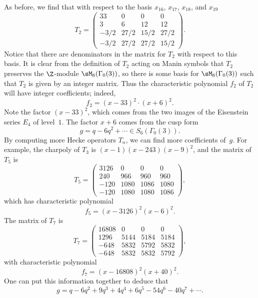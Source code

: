 \begin{example}
As before, we find that with respect to the basis 
$x_{16}$, $x_{17}$, $x_{18}$, and $x_{19}$
$$
T_2 = 
\left(\begin{array}{cccc}
33&0&0&0\\
3&6&12&12\\
-3/2&27/2&15/2&27/2\\
-3/2&27/2&27/2&15/2
\end{array}\right).
$$
Notice that there are denominators in the matrix for
$T_2$ with respect to this basis.  It is clear from
the definition of $T_2$ acting on Manin symbols that
$T_2$ preserves the $\Z$-module $\sM_6(\Gamma_0(3))$,
so there is some basis for $\sM_6(\Gamma_0(3))$
such that $T_2$ is given by an integer matrix.  Thus
the characteristic polynomial $f_2$ of $T_2$ will have integer
coefficients; indeed, 
$$
  f_2 = (x-33)^2 \cdot (x+6)^2.
$$
Note the factor $(x-33)^2$, which comes from the two images
of the Eisenstein series $E_4$ of level~$1$.  The
factor $x+6$ comes from the cusp form 
$$
  g = q - 6q^2 + \cdots \in S_6(\Gamma_0(3)).
$$
By computing more Hecke operators $T_n$, we
can find more coefficients of~$g$.
For example, the charpoly of $T_3$ is 
$(x-1)(x-243)(x-9)^2$, and the matrix of $T_5$
is 
$$
T_5 = \left(\begin{array}{cccc}
3126&0&0&0\\
240&966&960&960\\
-120&1080&1086&1080\\
-120&1080&1080&1086
\end{array}\right),
$$
which has characteristic polynomial
$$
  f_5 = (x-3126)^2 (x-6)^2.
$$
The matrix of $T_7$ is 
$$T_7 = \left(\begin{array}{cccc}
16808&0&0&0\\
1296&5144&5184&5184\\
-648&5832&5792&5832\\
-648&5832&5832&5792
\end{array}\right),
$$
with characteristic polynomial
$$
 f_7 = (x -16808)^2 (x + 40)^2.
$$
One can put this information together to deduce that
$$
  g = q - 6q^2 + 9q^3 + 4q^4 + 6q^5 - 54q^6 - 40q^7 +\cdots.
$$
\end{example}


